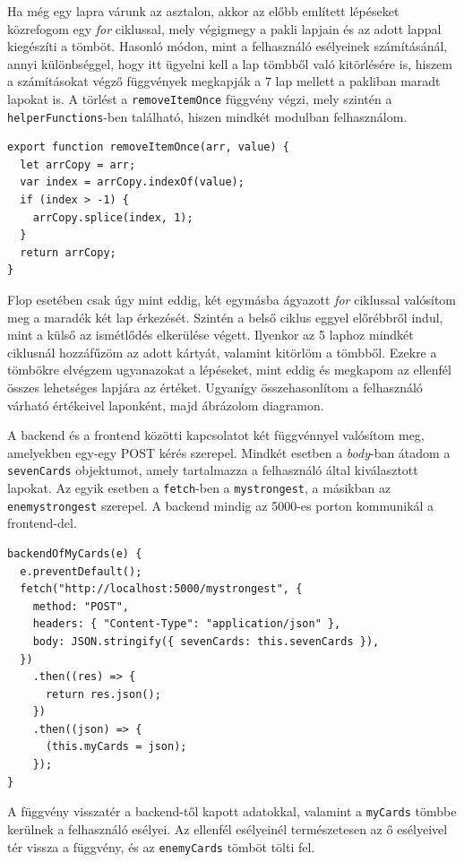 Ha még egy lapra várunk az asztalon, akkor az előbb említett lépéseket közrefogom egy \textit{for} ciklussal, mely végigmegy a pakli lapjain és az adott lappal kiegészíti a tömböt. Hasonló módon, mint a felhasználó esélyeinek számításánál, annyi különbséggel, hogy itt ügyelni kell a lap tömbből való kitörlésére is, hiszem a számításokat végző függvények megkapják a 7 lap mellett a pakliban maradt lapokat is. A törlést a \texttt{removeItemOnce} függvény végzi, mely szintén a \texttt{helperFunctions}-ben található, hiszen mindkét modulban felhasználom.

\begin{lstlisting}[style=htmlcssjs]
export function removeItemOnce(arr, value) {
  let arrCopy = arr;
  var index = arrCopy.indexOf(value);
  if (index > -1) {
    arrCopy.splice(index, 1);
  }
  return arrCopy;
}
\end{lstlisting}

Flop esetében csak úgy mint eddig, két egymásba ágyazott \textit{for} ciklussal valósítom meg a maradék két lap érkezését. Szintén a belső ciklus eggyel előrébbről indul, mint a külső az ismétlődés elkerülése végett. Ilyenkor az 5 laphoz mindkét ciklusnál hozzáfűzöm az adott kártyát, valamint kitörlöm a tömbből. Ezekre a tömbökre elvégzem ugyanazokat a lépéseket, mint eddig és megkapom az ellenfél összes lehetséges lapjára az értéket. Ugyanígy összehasonlítom a felhasználó várható értékeivel laponként, majd ábrázolom diagramon.


A backend és a frontend közötti kapcsolatot két függvénnyel valósítom meg, amelyekben egy-egy POST kérés szerepel. Mindkét esetben a \textit{body}-ban átadom a \texttt{sevenCards} objektumot, amely tartalmazza a felhasználó által kiválasztott lapokat. Az egyik esetben a \texttt{fetch}-ben a \texttt{mystrongest}, a másikban az \texttt{enemystrongest} szerepel. A backend mindig az 5000-es porton kommunikál a frontend-del.

\begin{lstlisting}[style=htmlcssjs]
backendOfMyCards(e) {
  e.preventDefault();
  fetch("http://localhost:5000/mystrongest", {
    method: "POST",
    headers: { "Content-Type": "application/json" },
    body: JSON.stringify({ sevenCards: this.sevenCards }),
  })
    .then((res) => {
      return res.json();
    })
    .then((json) => {
      (this.myCards = json);
    });
}
\end{lstlisting}

A függvény visszatér a backend-től kapott adatokkal, valamint a \texttt{myCards} tömbbe kerülnek a felhasználó esélyei. Az ellenfél esélyeinél természetesen az ő esélyeivel tér vissza a függvény, és az \texttt{enemyCards} tömböt tölti fel.

